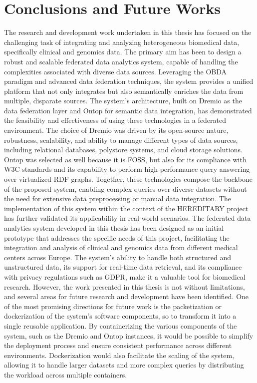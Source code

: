 
\chapter{Conclusions and Future Works}
\label{chp:conclusions}

The research and development work undertaken in this thesis has focused on the challenging task of integrating and analyzing heterogeneous biomedical data, specifically clinical and genomics data. The primary aim has been to design a robust and scalable federated data analytics system, capable of handling the complexities associated with diverse data sources. Leveraging the \ac{OBDA} paradigm and advanced data federation techniques, the system provides a unified platform that not only integrates but also semantically enriches the data from multiple, disparate sources.
The system's architecture, built on Dremio as the data federation layer and Ontop for semantic data integration, has demonstrated the feasibility and effectiveness of using these technologies in a federated environment. The choice of Dremio was driven by its open-source nature, robustness, scalability, and ability to manage different types of data sources, including relational databases, polystore systems, and cloud storage solutions. Ontop was selected as well because it is \ac{FOSS}, but also for its compliance with \ac{W3C} standards and its capability to perform high-performance query answering over virtualized \ac{RDF} graphs. Together, these technologies compose the backbone of the proposed system, enabling complex queries over diverse datasets without the need for extensive data preprocessing or manual data integration.
The implementation of this system within the context of the \ac{HEREDITARY} project has further validated its applicability in real-world scenarios. The federated data analytics system developed in this thesis has been designed as an initial prototype that addresses the specific needs of this project, facilitating the integration and analysis of clinical and genomics data from different medical centers across Europe. The system's ability to handle both structured and unstructured data, its support for real-time data retrieval, and its compliance with privacy regulations such as \ac{GDPR}, make it a valuable tool for biomedical research.
However, the work presented in this thesis is not without limitations, and several areas for future research and development have been identified. One of the most promising directions for future work is the packetization or dockerization of the system's software components, so to transform it into a single reusable application. By containerizing the various components of the system, such as the Dremio and Ontop instances, it would be possible to simplify the deployment process and ensure consistent performance across different environments. Dockerization would also facilitate the scaling of the system, allowing it to handle larger datasets and more complex queries by distributing the workload across multiple containers.
